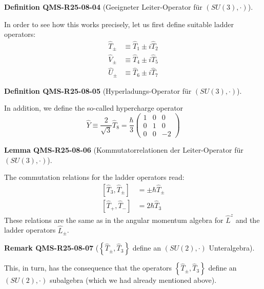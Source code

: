 \documentclass[10pt, letterpaper]{article}
\newcommand{\CustomHeading}[3]{%
  \par\medskip\noindent%
  \textbf{#1 #2} \textnormal{(#3)}.\enskip%
}
\newenvironment{DEF}[2]{\begin{unitbox}\CustomHeading{Definition}{#1}{#2}}{\end{unitbox}}
\newenvironment{LEM}[2]{\begin{unitbox}\CustomHeading{Lemma}{#1}{#2}}{\end{unitbox}}
\newenvironment{REM}[2]{\begin{unitbox}\CustomHeading{Remark}{#1}{#2}}{\end{unitbox}}
\begin{document}
\begin{DEF}{QMS-R25-08-04}{Geeigneter Leiter-Operator für $(S U(3), \cdot)$}
In order to see how this works precisely, let us first define suitable ladder operators:
$$
\begin{aligned}
\hat{T}_{ \pm} & \equiv \hat{T}_{1} \pm i \hat{T}_{2} \\
\hat{V}_{ \pm} & \equiv \hat{T}_{4} \pm i \hat{T}_{5} \\
\hat{U}_{ \pm} & \equiv \hat{T}_{6} \pm i \hat{T}_{7}
\end{aligned}
$$
\end{DEF}


\begin{DEF}{QMS-R25-08-05}{Hyperladungs-Operator für $(S U(3), \cdot)$}
In addition, we define the so-called hypercharge operator
$$
\hat{Y} \equiv \frac{2}{\sqrt{3}} \hat{T}_{8}=\frac{\hbar}{3}\left(\begin{array}{ccc}
1 & 0 & 0 \\
0 & 1 & 0 \\
0 & 0 & -2
\end{array}\right)
$$
\end{DEF}


\begin{LEM}{QMS-R25-08-06}{Kommutatorrelationen der Leiter-Operator für $(S U(3), \cdot)$}
The commutation relations for the ladder operators read:
$$
\begin{aligned}
{\left[\hat{T}_{3}, \hat{T}_{ \pm}\right] } & = \pm \hbar \hat{T}_{ \pm} \\
{\left[\hat{T}_{+}, \hat{T}_{-}\right] } & =2 \hbar \hat{T}_{3}
\end{aligned}
$$
These relations are the same as in the angular momentum algebra for $\hat{L}^{z}$ and the ladder operators $\hat{L}_{ \pm}$.
\end{LEM}


\begin{REM}{QMS-R25-08-07}{$\left\{\hat{T}_{ \pm}, \hat{T}_{3}\right\}$ define an $(S U(2), \cdot)$ Unteralgebra}
This, in turn, has the consequence that the operators $\left\{\hat{T}_{ \pm}, \hat{T}_{3}\right\}$ define an $(S U(2), \cdot)$ subalgebra (which we had already mentioned above).
\end{REM}
\end{document}
